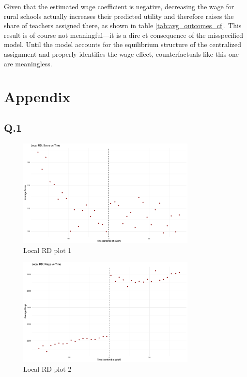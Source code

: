\documentclass{article}
\begin{document}
Given that the estimated wage coefficient is negative, decreasing the wage for rural schools actually increases their predicted utility and therefore raises the share of teachers assigned there, as shown in table \ref{tab:avg_outcomes_cf}. This result is of course not meaningful—it is a dire
ct consequence of the misspecified model. Until the model accounts for the equilibrium structure of the centralized assignment and properly identifies the wage effect, counterfactuals like this one are meaningless.


\section*{Appendix}
\subsection*{Q.1}

\begin{figure}[H]
    \centering
    \includegraphics[width=0.8\textwidth]{figures/q1_1.png}
    \caption{Local RD plot 1}
    \label{fig:rd1_1}
\end{figure}

\begin{figure}[H]
    \centering
    \includegraphics[width=0.8\textwidth]{figures/q1_2.png}
    \caption{Local RD plot 2}
    \label{fig:rd1_2}
\end{figure}
\end{document}

